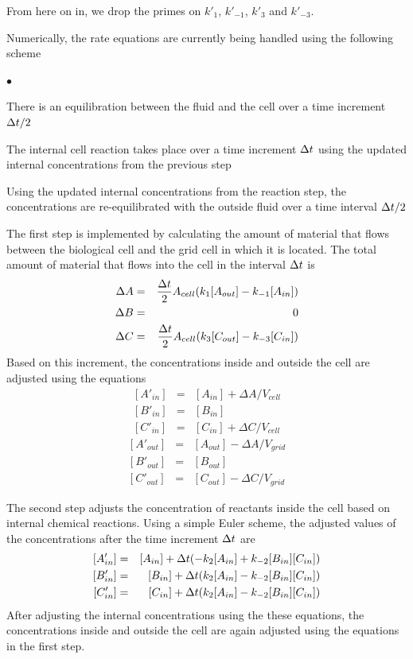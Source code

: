 \documentclass[12pt]{article}
\begin{document}
From here on in, we drop the primes on $k'_1$, $k'_{-1}$, $k'_3$ and $k'_{-3}$.

Numerically, the rate equations are currently being handled using the following scheme
\begin{list}{$\bullet$}{}
\item There is an equilibration between the fluid and the cell over a time
increment $\Delta t/2$
\item The internal cell reaction takes place over a time increment $\Delta t$
using the updated internal concentrations from the previous step
\item Using the updated internal concentrations from the reaction step, the
concentrations are re-equilibrated with the outside fluid over a time interval
$\Delta t/2$
\end{list}
The first step is implemented by calculating the amount of material that flows
between the biological cell and the grid cell in which it is located.
The total amount of
material that flows into the cell in the interval $\Delta t$ is
\begin{eqnarray*}
\Delta A & = & \frac{\Delta t}{2} A_{cell}(k_1 [A_{out}]-k_{-1} [A_{in}]) \\
\Delta B & = & 0 \\
\Delta C & = & \frac{\Delta t}{2} A_{cell}(k_3 [C_{out}]-k_{-3} [C_{in}]) \\
\end{eqnarray*}
Based on this increment, the concentrations inside and outside the cell are
adjusted using the equations
\begin{eqnarray}
\nonumber
[A'_{in}] &=& [A_{in}] + \Delta A/V_{cell} \\
\nonumber
[B'_{in}]  &=& [B_{in}] \\
\nonumber
[C'_{in}] &=& [C_{in}] + \Delta C/V_{cell}
\end{eqnarray}
\begin{eqnarray}
\nonumber
[A'_{out}] &=& [A_{out}] - \Delta A/V_{grid} \\
\nonumber
[B'_{out}]  & = & [B_{out}] \\
\nonumber
[C'_{out}] &=& [C_{out}] - \Delta C/V_{grid}
\end{eqnarray}

The second step adjusts the concentration of reactants inside the cell based on
internal chemical reactions. Using a simple Euler scheme, the adjusted values of
the concentrations after the time increment $\Delta t$ are
\begin{eqnarray}
\nonumber
[A'_{in}] &=& [A_{in}] + \Delta t(-k_2 [A_{in}] + k_{-2} [B_{in}][C_{in}]) \\
\nonumber
[B'_{in}] &=& [B_{in}] + \Delta t(k_2 [A_{in}] - k_{-2} [B_{in}][C_{in}]) \\
\nonumber
[C'_{in}] &=& [C_{in}] + \Delta t(k_2 [A_{in}] - k_{-2} [B_{in}][C_{in}])
\end{eqnarray}
After adjusting the internal concentrations using the these equations, the
concentrations inside and outside the cell are again adjusted using the
equations in the first step.
\end{document}

